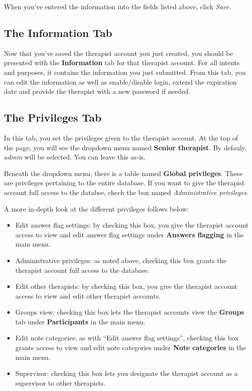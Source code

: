 \documentclass[
]{book}
\providecommand{\tightlist}{%
  \setlength{\itemsep}{0pt}\setlength{\parskip}{0pt}}
\begin{document}
When you've entered the information into the fields listed above, click \emph{Save}.

\subsection{The Information Tab}\label{the-information-tab}

Now that you've saved the therapist account you just created, you should be presented with the \textbf{Information} tab for that therapist account. For all intents and purposes, it contains the information you just submitted. From this tab, you can edit the information as well as enable/disable login, extend the expiration date and provide the therapist with a new password if needed.

\subsection{The Privileges Tab}\label{the-privileges-tab}

In this tab, you set the privileges given to the therapist account. At the top of the page, you will see the dropdown menu named \textbf{Senior therapist}. By defauly, \emph{admin} will be selected. You can leave this as-is.

Beneath the dropdown menu, there is a table named \textbf{Global privileges}. These are privileges pertaining to the entire database. If you want to give the therapist account full access to the databse, chech the box named \emph{Administrative privileges}.

A more in-depth look at the different privileges follows below:

\begin{itemize}
\tightlist
\item
  Edit answer flag settings: by checking this box, you give the therapist account access to view and edit answer flag settings under \textbf{Answers flagging} in the main menu.
\item
  Administrative privileges: as noted above, checking this box grants the therapist account full access to the database.
\item
  Edit other therapists: by checking this box, you give the therapist account access to view and edit other therapist accounts.
\item
  Groups view: checking this box lets the therapist accounts view the \textbf{Groups} tab under \textbf{Participants} in the main menu.
\item
  Edit note categories: as with ``Edit answer flag settings'', checking this box grants access to view and edit note categories under \textbf{Note categories} in the main menu.
\item
  Supervisor: checking this box lets you designate the therapist account as a supervisor to other therapists.
\end{itemize}
\end{document}
